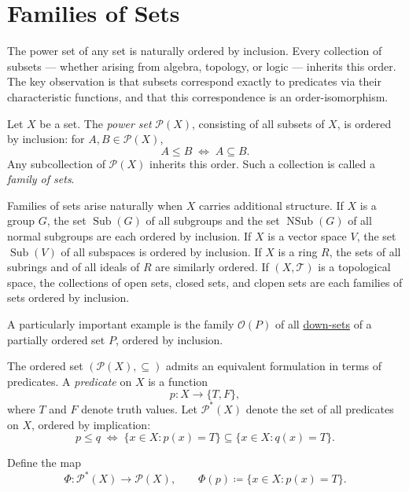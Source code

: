 
\section{Families of Sets}
\label{sec:families-of-sets}

\begin{remark*}
The power set of any set is naturally ordered by inclusion.  Every
collection of subsets --- whether arising from algebra, topology, or logic
--- inherits this order.  The key observation is that subsets correspond
exactly to predicates via their characteristic functions, and that this
correspondence is an order-isomorphism.
\end{remark*}

\begin{remark*}
Let $X$ be a set.  The \emph{power set} $\mathcal{P}(X)$, consisting of
all subsets of $X$, is ordered by inclusion: for $A, B \in \mathcal{P}(X)$,
\[
A \leq B \;\Longleftrightarrow\; A \subseteq B.
\]
Any subcollection of $\mathcal{P}(X)$ inherits this order.  Such a
collection is called a \emph{family of sets}.

Families of sets arise naturally when $X$ carries additional structure.
If $X$ is a group $G$, the set $\operatorname{Sub}(G)$ of all subgroups
and the set $\operatorname{NSub}(G)$ of all normal subgroups are each
ordered by inclusion.  If $X$ is a vector space $V$, the set
$\operatorname{Sub}(V)$ of all subspaces is ordered by inclusion.  If $X$
is a ring $R$, the sets of all subrings and of all ideals of $R$ are
similarly ordered.  If $(X, \mathcal{T})$ is a topological space, the
collections of open sets, closed sets, and clopen sets are each families
of sets ordered by inclusion.

A particularly important example is the family $\mathcal{O}(P)$ of all
\hyperref[def:down-set]{down-sets} of a partially ordered set $P$,
ordered by inclusion.
\end{remark*}

\begin{remark*}
The ordered set $(\mathcal{P}(X), \subseteq)$ admits an equivalent
formulation in terms of predicates.  A \emph{predicate} on $X$ is a
function
\[
p : X \to \{T, F\},
\]
where $T$ and $F$ denote truth values.  Let $\mathcal{P}^*(X)$ denote
the set of all predicates on $X$, ordered by implication:
\[
p \leq q
\;\Longleftrightarrow\;
\{x \in X : p(x) = T\} \subseteq \{x \in X : q(x) = T\}.
\]

Define the map
\[
\Phi : \mathcal{P}^*(X) \to \mathcal{P}(X),
\qquad
\Phi(p) \coloneqq \{x \in X : p(x) = T\}.
\]
\end{remark*}

